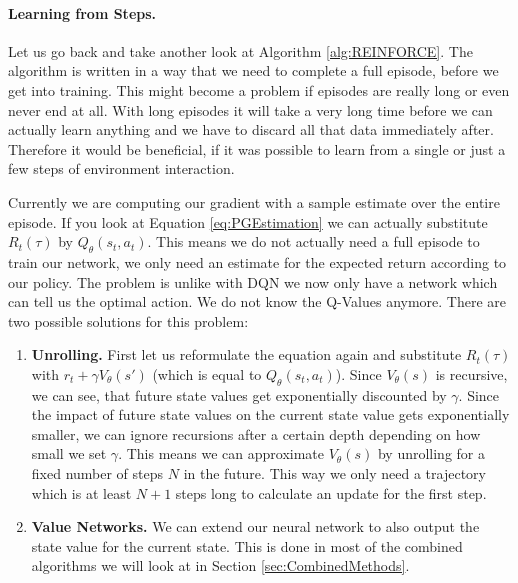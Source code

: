 \paragraph{Learning from Steps.}
Let us go back and take another look at Algorithm \ref{alg:REINFORCE}. The algorithm is written in a way that we need to complete a full episode, before we get into training. This might become a problem if episodes are really long or even never end at all. With long episodes it will take a very long time before we can actually learn anything and we have to discard all that data immediately after. Therefore it would be beneficial, if it was possible to learn from a single or just a few steps of environment interaction. 

Currently we are computing our gradient with a sample estimate over the entire episode. If you look at Equation \ref{eq:PGEstimation} we can actually substitute $R_t(\tau)$ by $Q_\theta(s_t, a_t)$. This means we do not actually need a full episode to train our network, we only need an estimate for the expected return according to our policy. The problem is unlike with DQN we now only have a network which can tell us the optimal action. We do not know the Q-Values anymore. There are two possible solutions for this problem:

\begin{enumerate}
  \item \textbf{Unrolling.} First let us reformulate the equation again and substitute $R_t(\tau)$ with $r_t + \gamma V_\theta(s')$ (which is equal to $Q_\theta(s_t, a_t)$). Since $V_\theta(s)$ is recursive, we can see, that future state values get exponentially discounted by $\gamma$. Since the impact of future state values on the current state value gets exponentially smaller, we can ignore recursions after a certain depth depending on how small we set $\gamma$. This means we can approximate $V_\theta(s)$ by unrolling for a fixed number of steps $N$ in the future. This way we only need a trajectory which is at least $N+1$ steps long to calculate an update for the first step. 
  \item \textbf{Value Networks.} We can extend our neural network to also output the state value for the current state. This is done in most of the combined algorithms we will look at in Section \ref{sec:CombinedMethods}.  
\end{enumerate}

